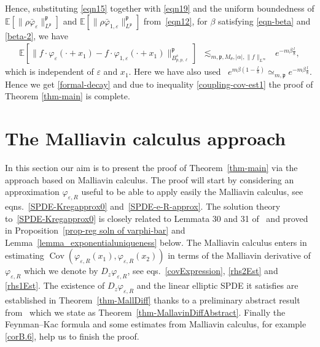 \documentclass{article}
\newcommand{\tmop}[1]{\ensuremath{\operatorname{#1}}}
\begin{document}
\noindent Hence, substituting \eqref{eqn15} together with \eqref{eqn19} and 
 the uniform boundedness of $\mathbb{E} [\| \rho \bar{\varphi}_{\varepsilon}
\|_{L^{\mathfrak{p}}}^{\mathfrak{p}}]$ and $\mathbb{E} [\| \rho
\bar{\varphi}_{1, \varepsilon} \|_{L^{\mathfrak{p}}}^{\mathfrak{p}}]$
from~\eqref{eqn12}, for $\beta$ satisfying \eqref{eqn-beta} and
\eqref{beta-2}, we have
%
\begin{equation}
  \begin{array}{lll}
    \mathbb{E} \left[\| f \cdot \varphi_{\varepsilon} (\cdot + x_1) - f \cdot
    \varphi_{1, \varepsilon} (\cdot + x_1) \|_{B_{p, p,
    \ell}^s}^{\mathfrak{p}} \right] & \lesssim_{m, \mathfrak{p}, M_{\theta}, | \alpha
    |, \| f \|_{L^{\infty}}} & e^{- m \beta \frac{l}{8}},
  \end{array} \label{eqn21}
\end{equation}
which is independent of $\varepsilon$ and $x_1$. Here we have also used \
$e^{m \beta \left( 1 - \frac{l}{8} \right)} \simeq_{m, \mathfrak{p}} e^{- m
\beta \frac{l}{8}}$. Hence we get \eqref{formal-decay} and due to inequality
\eqref{coupling-cov-est1} the proof of Theorem \ref{thm-main} is complete.







\section{The Malliavin calculus approach}\label{sec-malliavin}
\qquad In this section our aim is to present the proof of
Theorem~\ref{thm-main} via the approach based on Malliavin calculus. The proof will start by considering an approximation $\varphi_{\varepsilon, R}$ useful
to be able to apply easily the Malliavin calculus, see
eqns.~\eqref{SPDE-Kregapprox0} and~\eqref{SPDE-e-R-approx}. The solution
theory to~\eqref{SPDE-Kregapprox0} is closely related to Lemmata 30 and 31
of~{\cite{AVG2021}} and proved in Proposition~\ref{prop-reg soln of
varphi-bar} and Lemma~\ref{lemma_exponentialuniqueness} below. The Malliavin
calculus enters in estimating $\tmop{Cov} (\varphi_{\varepsilon, R} (x_1),
\varphi_{\varepsilon, R} (x_2))$ in terms of the Malliavin derivative of
$\varphi_{\varepsilon, R}$ which we denote by $D_z \varphi_{\varepsilon, R}$,
see eqs.~\eqref{covExpression}, \eqref{rhs2Est} and \eqref{rhs1Est}. The
existence of $D_z \varphi_{\varepsilon, R}$ and the linear elliptic SPDE it
satisfies are established in Theorem~\ref{thm-MallDiff} thanks to a
preliminary abstract result from~{\cite{Tindel98}} which we state as
Theorem~\ref{thm-MallavinDiffAbstract}. Finally the Feynman--Kac formula and
some estimates from Malliavin calculus, for example \eqref{corB.6}, help us to
finish the proof.
\end{document}
